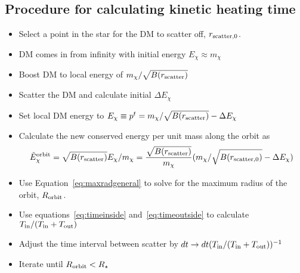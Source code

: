 \subsection{Procedure for calculating kinetic heating time}

\begin{itemize}
    \item Select a point in the star for the DM to scatter off, $r_{\rm scatter, 0}$. 
    \item DM comes in from infinity with initial energy $E_\chi \approx m_\chi$
    \item Boost DM to local energy of $m_\chi/\sqrt{B(r_{\rm scatter})}$
    \item Scatter the DM and calculate initial $\Delta E_\chi$
    \item Set local DM energy to $E_\chi \equiv p^t = m_\chi/\sqrt{B(r_{\rm scatter})} - \Delta E_\chi$
    \item Calculate the new conserved energy per unit mass along the orbit as 
    \begin{equation}
        \tilde E_\chi^{\rm orbit} = \sqrt{B(r_{\rm scatter})}E_\chi/m_\chi = \frac{\sqrt{B(r_{\rm scatter})}}{ m_\chi} (m_\chi/\sqrt{B(r_{\rm scatter, 0})} - \Delta E_\chi)
    \end{equation}
    \item Use Equation~\ref{eq:maxradgeneral} to solve for the maximum radius of the orbit, $R_{\rm orbit}$. 
    \item Use equations~\ref{eq:timeinside} and~\ref{eq:timeoutside} to calculate $T_{\rm in} / (T_{\rm in} + T_{\rm out})$
    \item Adjust the time interval between scatter by $dt\rightarrow dt (T_{\rm in} / (T_{\rm in} + T_{\rm out}))^{-1}$
    \item Iterate until $R_{\rm orbit} < R_\star$
\end{itemize}